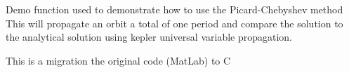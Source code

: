 Demo function used to demonstrate how to use the Picard-\/\+Chebyshev method This will propagate an orbit a total of one period and compare the solution to the analytical solution using kepler universal variable propagation.

This is a migration the original code (Mat\+Lab) to C 